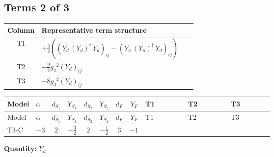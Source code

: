 \documentclass[8pt]{article}
\begin{document}
\begin{landscape}
\subsection*{Terms 2 of 3}
\begin{center}
\begin{tabular}{@{}c >{\raggedright\arraybackslash}p{0.82\linewidth}@{}}
\toprule
Column & Representative term structure \\
\midrule
T1 & \(\displaystyle +\frac{3}{2} (\left({Y_d}\,\left({Y_d}\right)^{\dagger}\,{Y_d}\right)_{ij}-\left({Y_u}\,\left({Y_u}\right)^{\dagger}\,{Y_d}\right)_{ij})\) \\
\midrule
T2 & \(\displaystyle -\frac{9}{4} {g_2}^2 \left({Y_d}\right)_{ij}\) \\
\midrule
T3 & \(\displaystyle -8 {g_3}^2 \left({Y_d}\right)_{ij}\) \\
\midrule
\bottomrule
\end{tabular}
\end{center}
\smallskip
\tiny
\begin{longtable}{@{}llcccccc >{\raggedright\arraybackslash}p{0.21\linewidth} >{\raggedright\arraybackslash}p{0.21\linewidth} >{\raggedright\arraybackslash}p{0.21\linewidth}@{}}
\toprule
Model & $\alpha$ & $d_{S_1}$ & $Y_{S_1}$ & $d_{S_2}$ & $Y_{S_2}$ & $d_F$ & $Y_F$ & T1 & T2 & T3 \\
\midrule
\endfirsthead
\toprule
Model & $\alpha$ & $d_{S_1}$ & $Y_{S_1}$ & $d_{S_2}$ & $Y_{S_2}$ & $d_F$ & $Y_F$ & T1 & T2 & T3 \\
\midrule
\endhead
T3-C & $-3$ & $2$ & $-\frac{3}{2}$ & $2$ & $-\frac{1}{2}$ & $3$ & $-1$ & \scriptsize\adjustbox{max width=\linewidth}{$\begin{gathered} +\frac{3}{2} (\left({Y_d}\,\left({Y_d}\right)^{\dagger}\,{Y_d}\right)_{ij}-\left({Y_u}\,\left({Y_u}\right)^{\dagger}\,{Y_d}\right)_{ij})\end{gathered}$} & \scriptsize\adjustbox{max width=\linewidth}{$\begin{gathered} -\frac{9}{4} {g_2}^2 \left({Y_d}\right)_{ij}\end{gathered}$} & \scriptsize\adjustbox{max width=\linewidth}{$\begin{gathered} -8 {g_3}^2 \left({Y_d}\right)_{ij}\end{gathered}$} \\
\midrule
\bottomrule
\end{longtable}
\clearpage
\noindent\textbf{Quantity: }$Y_d$\par\smallskip

\end{landscape}
\end{document}

